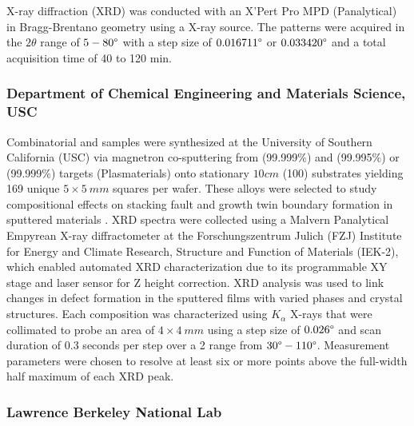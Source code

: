 X-ray diffraction (XRD) was conducted with an X’Pert Pro MPD (Panalytical) in Bragg-Brentano geometry using a  X-ray source. The patterns were acquired in the $2\theta$ range of $5-80\degree$ with a step size of $0.016711\degree$ or $0.033420\degree$ and a total acquisition time of 40 to 120 min. \\

\subsubsection*{Department of Chemical Engineering and Materials Science, USC}

Combinatorial  and  samples were synthesized at the University of Southern California (USC) via magnetron co-sputtering from  (99.999\%) and  (99.995\%) or  (99.999\%) targets (Plasmaterials) onto stationary $10 \si{cm}$  (100) substrates yielding 169 unique $5 \times 5 \ \si{mm}$ squares per wafer. These alloys were selected to study compositional effects on stacking fault and growth twin boundary formation in sputtered materials \cite{2024AcMat.27019839A,alwen2024combinatorial}. XRD spectra were collected using a Malvern Panalytical Empyrean X-ray diffractometer at the Forschungszentrum Julich (FZJ) Institute for Energy and Climate Research, Structure and Function of Materials (IEK-2), which enabled automated XRD characterization due to its programmable XY stage and laser sensor for Z height correction. XRD analysis was used to link changes in defect formation in the sputtered films with varied phases and crystal structures. Each composition was characterized using  $K_\alpha$ X-rays that were collimated to probe an area of $4 \times 4 \ \si{mm}$ using a step size of $0.026\degree$ and scan duration of $0.3$ seconds per step over a 2 range from $30\degree - 110\degree$. Measurement parameters were chosen to resolve at least six or more points above the full-width half maximum of each XRD peak.

\subsubsection*{Lawrence Berkeley National Lab}

